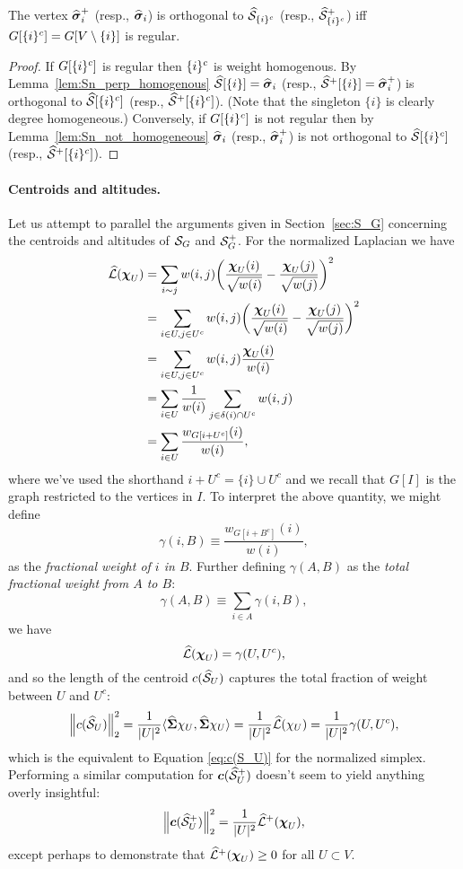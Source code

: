 \begin{corollary}
	\label{cor:Sn_orthog_iff_regular}
	The vertex $\widehat{\vb*{\sigma}}_i^+$ (resp., $\widehat{\vb*{\sigma}}_i$) is orthogonal to $\widehat{\mathcal{S}}_{\{i\}^c}$ (resp., $\widehat{\mathcal{S}}^+_{\{i\}^c}$) iff $G[{\{i\}^c}]=G[V\setminus\{i\}]$ is regular. 
\end{corollary}
\begin{proof}
	If $G[{\{i\}^c}]$ is regular then ${\{i\}^c}$ is weight homogenous. By Lemma~\ref{lem:Sn_perp_homogenous} $\widehat{\mathcal{S}}[\{i\}]=\widehat{\vb*{\sigma}}_i$ (resp., $\widehat{\mathcal{S}}^+[\{i\}]=\widehat{\vb*{\sigma}}_i^+$) is orthogonal to $\widehat{\mathcal{S}}[{\{i\}^c}]$ (resp., $\widehat{\mathcal{S}}^+[{\{i\}^c}]$). (Note that the singleton $\{i\}$ is clearly degree homogeneous.) Conversely, if $G[{\{i\}^c}]$ is not regular then by Lemma~\ref{lem:Sn_not_homogeneous} $\widehat{\vb*{\sigma}}_i$ (resp., $\widehat{\vb*{\sigma}}_i^+$) is not orthogonal to $\widehat{\mathcal{S}}[{\{i\}^c}]$ (resp., $\widehat{\mathcal{S}}^+[{\{i\}^c}]$).
\end{proof}

\paragraph{Centroids and altitudes.}
Let us attempt to parallel the arguments given in Section~\ref{sec:S_G}  concerning the centroids and altitudes of $\mathcal{S}_G$ and $\mathcal{S}_G^+$. For the normalized Laplacian we have
\begin{align}
\widehat{\mathcal{L}}(\boldsymbol{\chi}_U)&=\sum_{i\sim j}w(i,j) \bigg(\frac{\boldsymbol{\chi}_U(i)}{\sqrt{w(i)}}-\frac{\boldsymbol{\chi}_U(j)}{\sqrt{w(j)}}\bigg)^2 \notag \\
&= \sum_{i\in U,j\in U^c}w(i,j)\bigg(\frac{\boldsymbol{\chi}_U(i)}{\sqrt{w(i)}}-\frac{\boldsymbol{\chi}_U(j)}{\sqrt{w(j)}}\bigg)^2 \notag \\
&= \sum_{i\in U,j\in U^c}w(i,j)\frac{\boldsymbol{\chi}_U(i)}{w(i)} \notag \\
&= \sum_{i\in U}\frac{1}{w(i)} \sum_{j\in \delta(i)\cap U^c}w(i,j) \notag \\
&= \sum_{i\in U}\frac{w_{G[i+U^c]}(i)}{w(i)}, \label{eq:Lnf(chiU)}
\end{align}
where we've used the shorthand $i+U^c = \{i\}\cup U^c$ and we recall that $G[I]$ is the graph restricted to the vertices in $I$. 
To interpret the above quantity, we might define  
\[\gamma(i,B)\equiv \frac{w_{G[i+B^c]}(i)}{w(i)},\]
as the \emph{fractional weight of $i$ in $B$}. 
Further defining $\gamma(A,B)$ as the \emph{total fractional weight from $A$ to $B$}:
\[\gamma(A,B) \equiv \sum_{i\in A}\gamma(i,B), \]
we have 
\[\widehat{\mathcal{L}}(\boldsymbol{\chi}_U) = \gamma(U,U^c),\]
and so the length of the centroid $c(\widehat{\mathcal{S}}_U)$ captures the total fraction of weight between $U$ and $U^c$:
\begin{equation}
\label{eq:c(SnU)}
\norm{c(\widehat{\mathcal{S}}_U)}_2^2 = \frac{1}{|U|^2}\langle \widehat{\boldsymbol{\Sigma}}\chi_U,\widehat{\boldsymbol{\Sigma}}\chi_U\rangle = \frac{1}{|U|^2}\widehat{\mathcal{L}}(\chi_U) = \frac{1}{|U|^2} \gamma(U,U^c),
\end{equation}
which is the equivalent to Equation \ref{eq:c(S_U)} for the normalized simplex. Performing a similar computation for $\vb*{c}(\widehat{\mathcal{S}}^+_U)$ doesn't seem to yield anything overly insightful:
\[\norm{\vb*{c}(\widehat{\mathcal{S}}_U^+)}_2^2 = \frac{1}{|U|^2}\widehat{\mathcal{L}}^+(\boldsymbol{\chi}_U),\]
except perhaps to demonstrate that $\widehat{\mathcal{L}}^+(\boldsymbol{\chi}_U)\geq 0$ for all $U\subset V$. 


